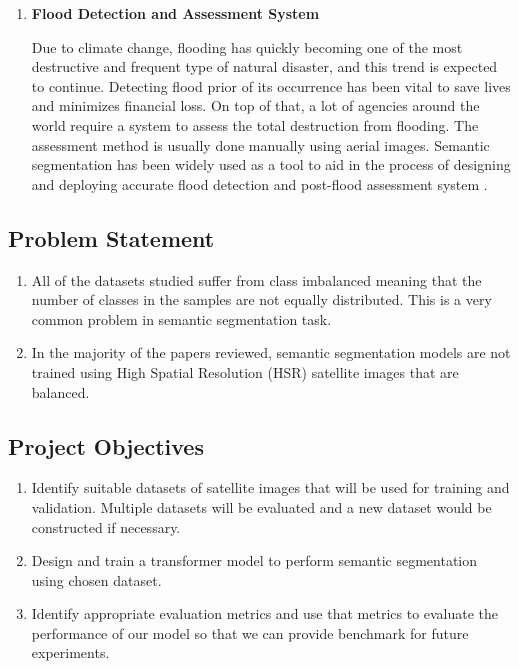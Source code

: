 \begin{enumerate}
    \item \textbf{Flood Detection and Assessment System}
    
    Due to climate change, flooding has quickly becoming one of the most destructive and frequent type of natural disaster, and this trend is expected to continue. Detecting flood prior of its occurrence has been vital to save lives and minimizes financial loss. On top of that, a lot of agencies around the world require a system to assess the total  destruction from flooding. The assessment method is usually done manually using aerial images. Semantic segmentation has been widely used as a tool to aid in the process of designing and deploying accurate flood detection and post-flood assessment system \cite{edseee.988427220220717}. 
\end{enumerate}

\subsection{Problem Statement}

\begin{enumerate}
    \item All of the datasets studied suffer from class imbalanced meaning that the number of classes in the samples are not equally distributed. This is a very common problem in semantic segmentation task.
    \item In the majority of the papers reviewed, semantic segmentation models are not trained using High Spatial Resolution (HSR) satellite images that are balanced.
\end{enumerate}


\subsection{Project Objectives}
\begin{enumerate}
    \item Identify suitable datasets of satellite images that will be used for training and validation. Multiple datasets will be evaluated and a new dataset would be constructed if necessary.
    \item Design and train a transformer model to perform semantic segmentation using chosen dataset.
    \item Identify appropriate evaluation metrics and use that metrics to evaluate the performance of our model so that we can provide benchmark for future experiments.
\end{enumerate}
